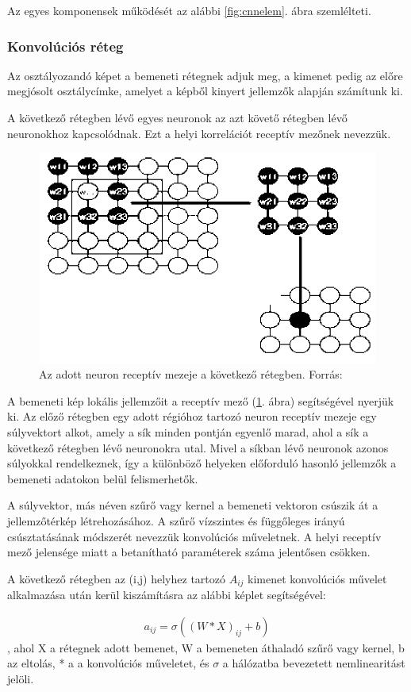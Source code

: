 \documentclass[12pt,a4]{article}
\begin{document}
	Az egyes komponensek működését az alábbi \ref{fig:cnnelem}. ábra szemlélteti.

	
	\subsubsection{Konvolúciós réteg}
	
	Az osztályozandó képet a bemeneti rétegnek adjuk meg, a kimenet pedig az előre megjósolt osztálycímke, amelyet a képből kinyert jellemzők alapján számítunk ki.
	
	A következő rétegben lévő egyes neuronok az azt követő rétegben lévő neuronokhoz kapcsolódnak. Ezt a helyi korrelációt receptív mezőnek nevezzük.
	
    \begin{figure}[h]	
		\centering
		\includegraphics[width=0.7\linewidth]{receptiv}
		\caption{Az adott neuron receptív mezeje a következő rétegben. Forrás: \cite{CNN}}
        \label{fig:neuron-receptive}
	\end{figure}
 
	A bemeneti kép lokális jellemzőit a receptív mező (\ref{fig:neuron-receptive}. ábra) segítségével nyerjük ki. Az előző rétegben egy adott régióhoz tartozó neuron receptív mezeje egy súlyvektort alkot, amely a sík minden pontján egyenlő marad, ahol a sík a következő rétegben lévő neuronokra utal. Mivel a síkban lévő neuronok azonos súlyokkal rendelkeznek, így a különböző helyeken előforduló hasonló jellemzők a bemeneti adatokon belül felismerhetők.
	
		\newpage
	A súlyvektor, más néven szűrő vagy kernel a bemeneti vektoron csúszik át a jellemzőtérkép létrehozásához.
	A szűrő vízszintes és függőleges irányú csúsztatásának módszerét nevezzük konvolúciós műveletnek. A helyi receptív mező jelensége miatt a betanítható paraméterek száma jelentősen csökken.
	
	A következő rétegben az (i,j) helyhez tartozó $A_{ij}$ kimenet konvolúciós
	művelet alkalmazása után kerül kiszámításra az alábbi képlet segítségével:
	\begin{mdframed}
	\begin{align}
		a_{ij} = \sigma((W * X)_{ij} + b)
	\end{align}
	, ahol X a rétegnek adott bemenet, W a bemeneten áthaladó szűrő vagy kernel,
	b az eltolás, * a 
	a konvolúciós műveletet, és $\sigma$ a hálózatba bevezetett nemlinearitást jelöli.
	\end{mdframed}
	
\end{document}
